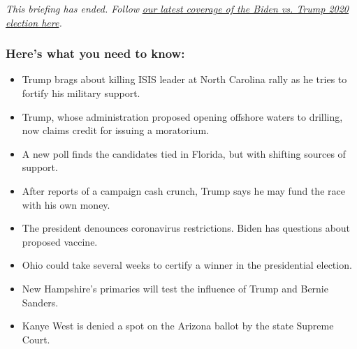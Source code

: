 \emph{This briefing has ended. Follow}
\href{https://www.nytimes3xbfgragh.onion/live/2020/09/09/us/trump-vs-biden}{\emph{our
latest coverage of the Biden vs. Trump 2020 election here}}\emph{.}

\hypertarget{heres-what-you-need-to-know}{%
\subsubsection{Here's what you need to
know:}\label{heres-what-you-need-to-know}}

\begin{itemize}
\item
  \protect\hyperlink{trump-brags-about-killing-isis-leader-at-north-carolina-rally-as-he-tries-to-fortify-his-military-support}{}

  Trump brags about killing ISIS leader at North Carolina rally as he
  tries to fortify his military support.
\item
  \protect\hyperlink{trump-whose-administration-proposed-opening-offshore-waters-to-drilling-now-claims-credit-for-issuing-a-moratorium}{}

  Trump, whose administration proposed opening offshore waters to
  drilling, now claims credit for issuing a moratorium.
\item
  \protect\hyperlink{a-new-poll-finds-the-candidates-tied-in-florida-but-with-shifting-sources-of-support}{}

  A new poll finds the candidates tied in Florida, but with shifting
  sources of support.
\item
  \protect\hyperlink{after-reports-of-a-campaign-cash-crunch-trump-says-he-may-fund-the-race-with-his-own-money}{}

  After reports of a campaign cash crunch, Trump says he may fund the
  race with his own money.
\item
  \protect\hyperlink{the-president-denounces-coronavirus-restrictions-biden-has-questions-about-proposed-vaccine}{}

  The president denounces coronavirus restrictions. Biden has questions
  about proposed vaccine.
\item
  \protect\hyperlink{ohio-could-take-several-weeks-to-certify-a-winner-in-the-presidential-election}{}

  Ohio could take several weeks to certify a winner in the presidential
  election.
\item
  \protect\hyperlink{new-hampshires-primaries-will-test-the-influence-of-trump-and-bernie-sanders}{}

  New Hampshire's primaries will test the influence of Trump and Bernie
  Sanders.
\item
  \protect\hyperlink{kanye-west-is-denied-a-spot-on-the-arizona-ballot-by-the-state-supreme-court}{}

  Kanye West is denied a spot on the Arizona ballot by the state Supreme
  Court.
\end{itemize}

